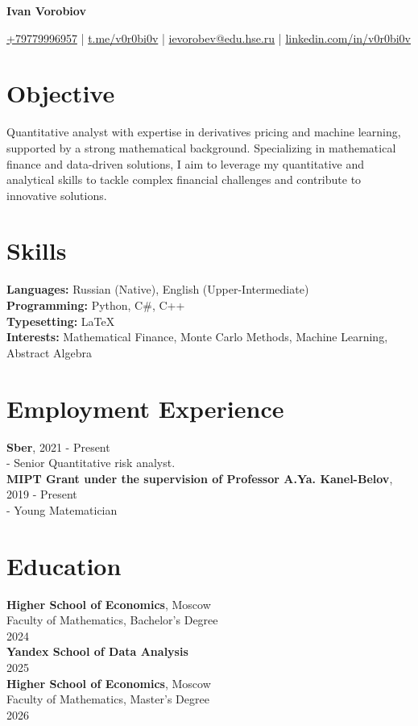 \documentclass[a4paper,10pt]{article}
\begin{document}
    \begin{center}
        \textbf{\LARGE Ivan Vorobiov}
    \end{center}
    \begin{center}
        \small
        \href{tel:+79779996957}{+79779996957} | \href{https://t.me/v0r0bi0v}{t.me/v0r0bi0v} | \href{mailto:ievorobev@edu.hse.ru}{ievorobev@edu.hse.ru} | \href{https://linkedin.com/in/v0r0bi0v}{linkedin.com/in/v0r0bi0v}
    \end{center}

    \section*{Objective}
    Quantitative analyst with expertise in derivatives pricing and machine learning, supported by a strong mathematical background. Specializing in mathematical finance and data-driven solutions, I aim to leverage my quantitative and analytical skills to tackle complex financial challenges and contribute to innovative solutions.

    \section*{Skills}
    \textbf{Languages:} Russian (Native), English (Upper-Intermediate) \\
    \textbf{Programming:} Python, C\#, C++ \\
    \textbf{Typesetting:} LaTeX \\
    \textbf{Interests:} Mathematical Finance, Monte Carlo Methods, Machine Learning, Abstract Algebra

    \section*{Employment Experience}
    \textbf{Sber}, 2021 - Present \\
    - Senior Quantitative risk analyst.\\
    \textbf{MIPT Grant under the supervision of Professor A.Ya. Kanel-Belov}, 2019 - Present \\
    - Young Matematician

    \section*{Education}
    \textbf{Higher School of Economics}, Moscow \\
    Faculty of Mathematics, Bachelor's Degree \\
    2024\\
    \textbf{Yandex School of Data Analysis} \\
    2025\\
    \textbf{Higher School of Economics}, Moscow \\
    Faculty of Mathematics, Master's Degree \\
    2026
\end{document}
